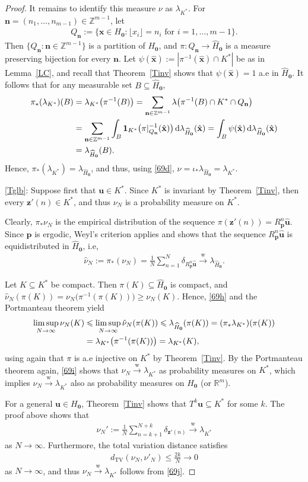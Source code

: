 \documentclass[11pt,reqno,tbtags,a4paper]{amsart}
\numberwithin{equation}{section}
\renewcommand\le{\leq}
\renewcommand\ge{\geq}
\renewcommand\leq{\leqslant}
\renewcommand\geq{\geqslant}
\theoremstyle{plain}%
\theoremstyle{definition}
\theoremstyle{remark}
\newcommand\pfitemx[1]{\par#1:}
\newcommand\pfitemref[1]{\pfitemx{\ref{#1}}}
\newcommand{\refT}[1]{Theorem~\ref{#1}}
\newcommand{\refL}[1]{Lemma~\ref{#1}}
\newcommand\set[1]{\ensuremath{\{#1\}}}
\newcommand\bigpar[1]{\bigl(#1\bigr)}
\newcommand\floor[1]{\lfloor#1\rfloor}
\newcommand\Ntoo{\ensuremath{{N\to\infty}}}
\newcommand\punkt{\xperiod}    %
\newcommand\ie{i.e\punkt}
\newcommand{\aex}{a.e\punkt}
\newcommand{\tend}{\longrightarrow}
\newcommand\wto{\overset{\mathrm{w}}{\tend}}
\newcommand\bbR{\mathbb R}
\newcommand\bbZ{\mathbb Z}
\newcommand\gd{\delta}
\newcommand\gl{\lambda}
\newcommand\etta{\boldsymbol1}
\newcommand\qw{^{-1}}
\newcommand\dtv{d_{\mathrm{TV}}}
\newcommand\dd{\,\mathrm{d}}
\newcommand\Ho{H_{\0}}
\newcommand\hHo{\hH_{\0}}
\newcommand\vn{\mathbf{n}}
\newcommand\vp{\mathbf{p}}
\newcommand\vu{\mathbf{u}}
\newcommand\hvu{{\hat{\mathbf{u}}}}
\newcommand\vx{\mathbf{x}}
\newcommand\vz{\mathbf{z}}
\newcommand\hvx{\hat{\mathbf{x}}}
\newcommand\hnu{\hat{\nu}}
\newcommand\Rp{R_\vp}
\newcommand\hH{\widehat{H}}
\newcommand\Kx{K^*}
\newcommand\glKx{\gl_{\Kx}}
\newcommand\stj{_*}
\newcommand\glhHo{\gl_{\hHo}}
\newcommand\0{{\boldsymbol 0}}
\newcommand\1{{\boldsymbol 1}}
\begin{document}
\begin{proof}
It remains to identify this measure $\nu$ as $\glKx$.
For $\vn=(n_1,\dots,n_{m-1})\in\bbZ^{m-1}$, let 
\begin{align}\label{69f}
  Q_\vn:=\set{\vx\in\Ho: \floor{x_i}=n_i \text{ for } i=1,\dots,m-1}.
\end{align}
Then $\set{Q_\vn:\vn\in\bbZ^{m-1}}$ is a partition of $\Ho$, and
  $\pi:Q_\vn\to\hHo$ is a measure preserving bijection for every $\vn$.
Let 
$\psi(\hvx):= |\pi\qw(\hvx)\cap \Kx|$
be as in \refL{LC}, and 
recall that \refT{Tinv} shows that
$\psi(\hvx)=1$ \aex{} in $\hHo$.
It follows that for any measurable set $B\subseteq\hHo$,
\begin{align}\label{69g}
  \pi\stj(\glKx)(B)&
=\glKx\bigpar{\pi\qw(B)}
=\sum_{\vn\in\bbZ^{m-1}}\gl\bigpar{\pi\qw(B)\cap\Kx\cap Q_\vn}
\notag\\&
%
=\sum_{\vn\in\bbZ^{m-1}}\int_B\etta_{\Kx}\bigpar{\pi|_{Q_\vn}\qw(\hvx)}
\dd\glhHo(\hvx)
=\int_B\psi(\hvx)\dd\glhHo(\hvx)
\notag\\&
=\glhHo(B).
\end{align}
Hence, $\pi\stj(\glKx)=\glhHo$, and thus, using \eqref{69d},
$\nu=\iota\stj\glhHo=\glKx$.


\pfitemref{Tglb}
Suppose first that $\vu\in\Kx$. Since $\Kx$ is invariant by \refT{Tinv},
then every $\vz'(n)\in\Kx$, and thus $\nu_N$ is  a probability measure on
$\Kx$.

Clearly, $\pi\stj\nu_N$ is the empirical distribution of the sequence
$\pi(\vz'(n))=\Rp^n\hvu$. Since $\vp$ is ergodic, 
Weyl's criterion applies and shows that the sequence $\Rp^n\hvu$ is
equidistributed in $\hHo$, \ie,
\begin{align}\label{69h}
\hnu_N:=  \pi\stj(\nu_N)=\frac{1}{N}\sum_{n=1}^N\gd_{\Rp^n\hvu}\wto \glhHo.
\end{align}

Let $K\subseteq\Kx$ be compact. Then $\pi(K)\subseteq\hHo$ is compact, and 
$\hnu_N(\pi(K)) =\nu_N\bigpar{\pi\qw(\pi(K))}\ge\nu_N(K)$.
Hence, \eqref{69h} and the Portmanteau theorem
\cite[Theorem 2.1]{Billingsley1968}
yield
\begin{align}\label{69i}
  \limsup_\Ntoo \nu_N(K) &
\le
  \limsup_\Ntoo \hnu_N(\pi(K))
\le \glhHo(\pi(K))
=(\pi\stj\glKx)(\pi(K) )
\notag\\&
=\glKx\bigpar{\pi\qw(\pi(K) )}
=\glKx(K),
\end{align}
using again that $\pi$ is \aex{} injective on $\Kx$ by \refT{Tinv}.
By the Portmanteau theorem again,
\eqref{69i} shows that $\nu_N\wto\glKx$ as probability measures on $\Kx$,
which implies $\nu_N\wto\glKx$ also as probability measures on $\Ho$ (or
$\bbR^m$). 

For a general $\vu\in \Ho$, \refT{Tinv} shows that 
$T^k\vu\subseteq\Kx$ for some $k$.
The proof above shows that
\begin{align}\label{69j}
\nu_N':=  \frac{1}{N}\sum_{n=k+1}^{N+k}\gd_{\vz'(n)}\wto\glKx
\end{align}
as \Ntoo. Furthermore, the total variation distance satisfies
\begin{align}
  \dtv(\nu_N,\nu'_N)\le \frac{2k}{N}\to0
\end{align}
as \Ntoo, and thus $\nu_N\wto\glKx$ follows from \eqref{69j}.
\end{proof}
\end{document}
